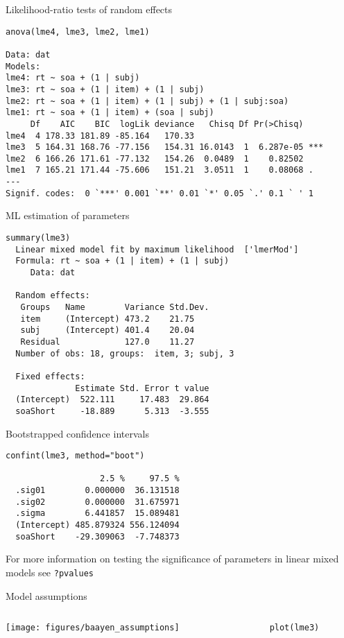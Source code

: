 \documentclass{beamer}
\begin{document}
\begin{frame}[fragile]{Likelihood-ratio tests of random effects}
\begin{lstlisting}
anova(lme4, lme3, lme2, lme1)

Data: dat
Models:
lme4: rt ~ soa + (1 | subj)
lme3: rt ~ soa + (1 | item) + (1 | subj)
lme2: rt ~ soa + (1 | item) + (1 | subj) + (1 | subj:soa)
lme1: rt ~ soa + (1 | item) + (soa | subj)
     Df    AIC    BIC  logLik deviance   Chisq Df Pr(>Chisq)    
lme4  4 178.33 181.89 -85.164   170.33                          
lme3  5 164.31 168.76 -77.156   154.31 16.0143  1  6.287e-05 ***
lme2  6 166.26 171.61 -77.132   154.26  0.0489  1    0.82502    
lme1  7 165.21 171.44 -75.606   151.21  3.0511  1    0.08068 .  
---
Signif. codes:  0 `***' 0.001 `**' 0.01 `*' 0.05 `.' 0.1 ` ' 1
\end{lstlisting}
\end{frame}

\begin{frame}[fragile]{ML estimation of parameters}
\begin{lstlisting}
summary(lme3)
  Linear mixed model fit by maximum likelihood  ['lmerMod']
  Formula: rt ~ soa + (1 | item) + (1 | subj)
     Data: dat
  
  Random effects:
   Groups   Name        Variance Std.Dev.
   item     (Intercept) 473.2    21.75   
   subj     (Intercept) 401.4    20.04   
   Residual             127.0    11.27   
  Number of obs: 18, groups:  item, 3; subj, 3
  
  Fixed effects:
              Estimate Std. Error t value
  (Intercept)  522.111     17.483  29.864
  soaShort     -18.889      5.313  -3.555
\end{lstlisting}
\end{frame}

\begin{frame}[fragile]{Bootstrapped confidence intervals}
\begin{lstlisting}
confint(lme3, method="boot")

                   2.5 %     97.5 %
  .sig01        0.000000  36.131518
  .sig02        0.000000  31.675971
  .sigma        6.441857  15.089481
  (Intercept) 485.879324 556.124094
  soaShort    -29.309063  -7.748373
\end{lstlisting}
For more information on testing the significance of parameters in linear
  mixed models see \verb+?pvalues+
\end{frame}

\begin{frame}[fragile]{Model assumptions}
  \begin{columns}
    \begin{column}{6cm}
      \texttt{[image: figures/baayen\_assumptions]}
    \end{column}
    \begin{column}{4cm}
      \begin{lstlisting}
        plot(lme3)
      \end{lstlisting}
    \end{column}
  \end{columns}
\end{frame}
\end{document}
